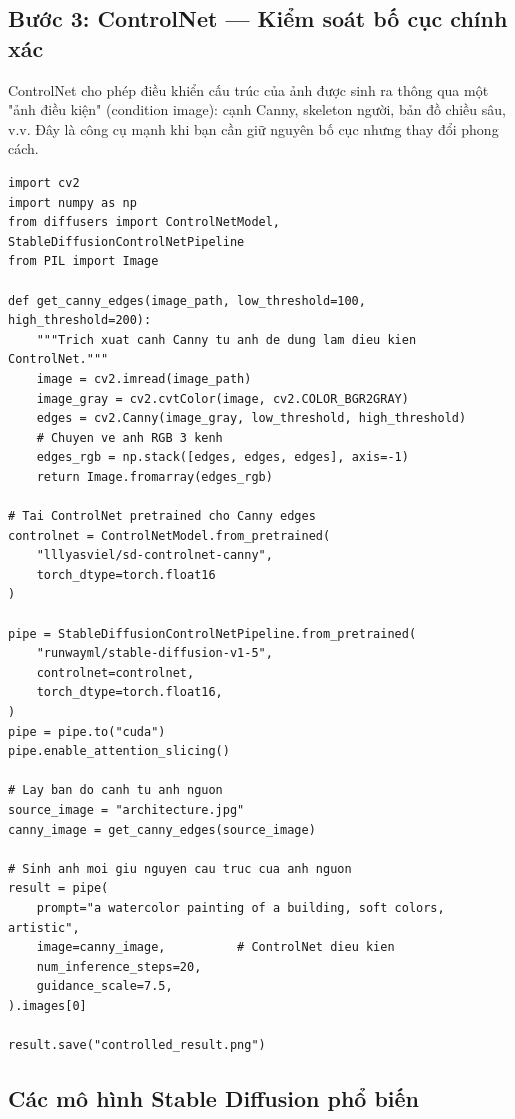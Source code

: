 \subsection{Bước 3: ControlNet --- Kiểm soát bố cục chính xác}
\label{subsec:sd_controlnet}

ControlNet cho phép điều khiển cấu trúc của ảnh được sinh ra thông qua một "ảnh điều kiện" (condition image): cạnh Canny, skeleton người, bản đồ chiều sâu, v.v. Đây là công cụ mạnh khi bạn cần giữ nguyên bố cục nhưng thay đổi phong cách.

\begin{verbatim}
import cv2
import numpy as np
from diffusers import ControlNetModel, StableDiffusionControlNetPipeline
from PIL import Image

def get_canny_edges(image_path, low_threshold=100, high_threshold=200):
    """Trich xuat canh Canny tu anh de dung lam dieu kien ControlNet."""
    image = cv2.imread(image_path)
    image_gray = cv2.cvtColor(image, cv2.COLOR_BGR2GRAY)
    edges = cv2.Canny(image_gray, low_threshold, high_threshold)
    # Chuyen ve anh RGB 3 kenh
    edges_rgb = np.stack([edges, edges, edges], axis=-1)
    return Image.fromarray(edges_rgb)

# Tai ControlNet pretrained cho Canny edges
controlnet = ControlNetModel.from_pretrained(
    "lllyasviel/sd-controlnet-canny",
    torch_dtype=torch.float16
)

pipe = StableDiffusionControlNetPipeline.from_pretrained(
    "runwayml/stable-diffusion-v1-5",
    controlnet=controlnet,
    torch_dtype=torch.float16,
)
pipe = pipe.to("cuda")
pipe.enable_attention_slicing()

# Lay ban do canh tu anh nguon
source_image = "architecture.jpg"
canny_image = get_canny_edges(source_image)

# Sinh anh moi giu nguyen cau truc cua anh nguon
result = pipe(
    prompt="a watercolor painting of a building, soft colors, artistic",
    image=canny_image,          # ControlNet dieu kien
    num_inference_steps=20,
    guidance_scale=7.5,
).images[0]

result.save("controlled_result.png")
\end{verbatim}

\subsection{Các mô hình Stable Diffusion phổ biến}
\label{subsec:sd_models_table}

